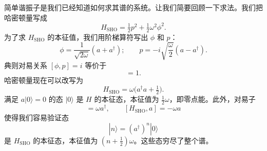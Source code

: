 简单谐振子是我们已经知道如何求其谱的系统。让我们简要回顾一下求法。我们把哈密顿量写成
\begin{equation}
  H_{\mathrm{SHO}} = \tfrac{1}{2}p^2 + \tfrac{1}{2}\omega^2\phi^2 .
\end{equation}
为了求 $H_{\mathrm{SHO}}$ 的本征值，我们用阶梯算符写出 $\phi$ 和 $p$：
\begin{equation}
  \phi = \frac{1}{\sqrt{2\omega}}(a + a^\dagger);\qquad
  p = -i\sqrt{\frac{\omega}{2}}(a - a^\dagger) .
  \label{eq:2.23}
\end{equation}
典则对易关系 $[\phi, p] = i$ 等价于
\begin{equation}
  [a, a^\dagger] = 1.
  \label{eq:2.24}
\end{equation}
哈密顿量现在可以改写为
\begin{equation}
  H_{\mathrm{SHO}} = \omega\bigl( a^\dagger a + \tfrac{1}{2} \bigr).
\end{equation}
满足 $a|0\rangle = 0$ 的态 $|0\rangle$ 是 $H$ 的本征态，本征值为 $\tfrac{1}{2}\omega$，即零点能。此外，对易子
\begin{equation}
  [H_{\mathrm{SHO}}, a^\dagger] = \omega a^\dagger,
  \qquad [H_{\mathrm{SHO}}, a] = -\omega a
\end{equation}
使得我们容易验证态
\begin{equation}
  |n\rangle = (a^\dagger)^n |0\rangle
\end{equation}
是 $H_{\mathrm{SHO}}$ 的本征态，本征值为 $(n+\tfrac{1}{2})\omega$。这些态穷尽了整个谱。

